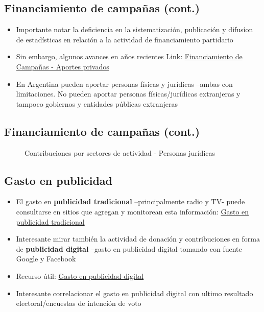 \documentclass[
  letterpaper,
  DIV=11,
  numbers=noendperiod]{scrartcl}
\providecommand{\tightlist}{%
  \setlength{\itemsep}{0pt}\setlength{\parskip}{0pt}}\usepackage{longtable,booktabs,array}
\begin{document}
\subsection{Financiamiento de campañas
(cont.)}\label{financiamiento-de-campauxf1as-cont.}

\begin{itemize}
\tightlist
\item
  Importante notar la deficiencia en la sistematización, publicación y
  difusíon de estadísticas en relación a la actividad de financiamiento
  partidario
\item
  Sin embargo, algunos avances en años recientes Link:
  \href{https://www.electoral.gov.ar/financiamiento/aportes-privados.php}{Financiamiento
  de Campañas - Aportes privados}
\item
  En Argentina pueden aportar personas físicas y jurídicas --ambas con
  limitaciones. No pueden aportar personas físicas/jurídicas extranjeras
  y tampoco gobiernos y entidades públicas extranjeras
\end{itemize}

\subsection{Financiamiento de campañas
(cont.)}\label{financiamiento-de-campauxf1as-cont.-1}

\begin{figure}

{\centering 

}

\caption{Contribuciones por sectores de actividad - Personas jurídicas}

\end{figure}%

\subsection{Gasto en publicidad}\label{gasto-en-publicidad}

\begin{itemize}
\tightlist
\item
  El gasto en \textbf{publicidad tradicional} --principalmente radio y
  TV- puede consultarse en sitios que agregan y monitorean esta
  información: \href{https://www.opensecrets.org/political-ads}{Gasto en
  publicidad tradicional}
\item
  Interesante mirar también la actividad de donación y contribuciones en
  forma de \textbf{publicidad digital} --gasto en publicidad digital
  tomando con fuente Google y Facebook
\item
  Recurso útil:
  \href{https://www.opensecrets.org/online-ads/map/google}{Gasto en
  publicidad digital}
\item
  Interesante correlacionar el gasto en publicidad digital con ultimo
  resultado electoral/encuestas de intención de voto
\end{itemize}
\end{document}
